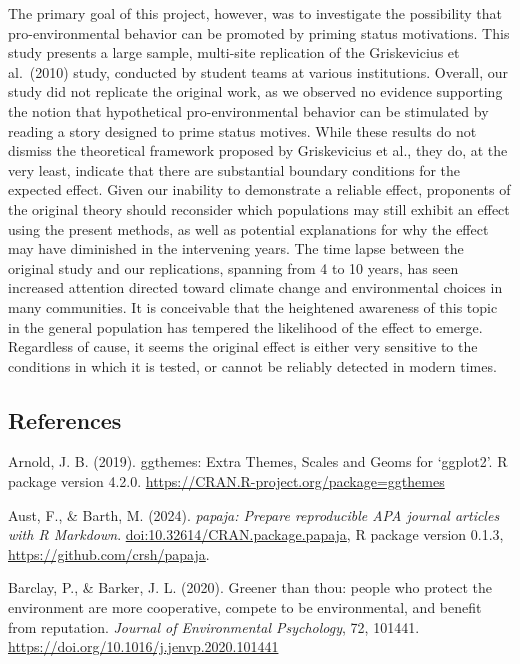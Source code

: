 \documentclass[
]{article}
\begin{document}
The primary goal of this project, however, was to investigate the
possibility that pro-environmental behavior can be promoted by priming
status motivations. This study presents a large sample, multi-site
replication of the Griskevicius et al.~(2010) study, conducted by
student teams at various institutions. Overall, our study did not
replicate the original work, as we observed no evidence supporting the
notion that hypothetical pro-environmental behavior can be stimulated by
reading a story designed to prime status motives. While these results do
not dismiss the theoretical framework proposed by Griskevicius et al.,
they do, at the very least, indicate that there are substantial boundary
conditions for the expected effect. Given our inability to demonstrate a
reliable effect, proponents of the original theory should reconsider
which populations may still exhibit an effect using the present methods,
as well as potential explanations for why the effect may have diminished
in the intervening years. The time lapse between the original study and
our replications, spanning from 4 to 10 years, has seen increased
attention directed toward climate change and environmental choices in
many communities. It is conceivable that the heightened awareness of
this topic in the general population has tempered the likelihood of the
effect to emerge. Regardless of cause, it seems the original effect is
either very sensitive to the conditions in which it is tested, or cannot
be reliably detected in modern times.

\newpage

\subsection{References}\label{references}

Arnold, J. B. (2019). ggthemes: Extra Themes, Scales and Geoms for
`ggplot2'. R package version 4.2.0.
\url{https://CRAN.R-project.org/package=ggthemes}

Aust, F., \& Barth, M. (2024). \emph{papaja: Prepare reproducible APA
journal articles with R Markdown}.
\url{doi:10.32614/CRAN.package.papaja}, R package version 0.1.3,
\url{https://github.com/crsh/papaja}.

Barclay, P., \& Barker, J. L. (2020). Greener than thou: people who
protect the environment are more cooperative, compete to be
environmental, and benefit from reputation. \emph{Journal of
Environmental Psychology}, 72, 101441.
\url{https://doi.org/10.1016/j.jenvp.2020.101441}
\end{document}
